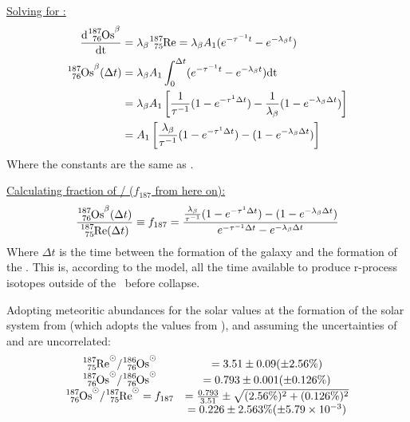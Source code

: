 \underline{Solving for :}
\begin{align*}
  \d{\os{187}^\beta} &= \lambda_\beta \re{187} = \lambda_\beta A_1 (e^{-\tau^{-1}t} - e^{-\lambda_\beta t}) \\
  \os{187}^\beta(\Delta t) &= \lambda_\beta A_1 \int_0^{\Delta t} (e^{-\tau^{-1}t} - e^{-\lambda_\beta t}) \textrm{dt} \\
  &= \lambda_\beta A_1 \left[ \frac{1}{\tau^{-1}} (1-e^{-\tau^{1}\Delta t}) - \frac{1}{\lambda_\beta} (1-e^{-\lambda_\beta \Delta t}) \right] \\
  &= A_1 \left[ \frac{\lambda_\beta}{\tau^{-1}} (1-e^{-\tau^{1}\Delta t}) - (1-e^{-\lambda_\beta \Delta t}) \right] \\
\end{align*}
Where the constants are the same as .

\newcommand\fraction{\frac{\os{187}}{\re{187}}}
\newcommand\fracfsos{f_{187}(t_{sos})}
\newcommand\fracnow{f_{187}(t_{now})}
\underline{Calculating fraction of / ($f_{187}$ from here on):}
\begin{equation}
  \label{eq:luck-fractio}
  \frac{\os{187}^\beta(\Delta t)}{\re{187}(\Delta t)} \equiv f_{187} = \frac{\frac{\lambda_\beta}{\tau^{-1}} (1-e^{-\tau^{1}\Delta t}) - (1-e^{-\lambda_\beta \Delta t})}{e^{-\tau^{-1} \Delta t} - e^{-\lambda_\beta \Delta t}}
\end{equation}
Where $\Delta t$ is the time between the formation of the galaxy and the formation of the \sos. This is, according to the model, all the time available to produce r-process isotopes outside of the \sos\ before collapse.

Adopting meteoritic abundances for the solar values at the formation of the solar system from  (which adopts the values from ), and assuming the uncertainties of  and  are uncorrelated:
\begin{equation}
  \label{eq:shizuma-frac}
  \begin{array}{cc}
    \re{187}^\odot/\os{186}^\odot &= 3.51 \pm 0.09 (\pm 2.56\%) \\
    \os{187}^\odot/\os{186}^\odot &= 0.793 \pm 0.001 (\pm 0.126\%) \\
    \os{187}^\odot/\re{187}^\odot = f_{187} &= \frac{0.793}{3.51} \pm \sqrt{(2.56\%)^2 + (0.126\%)^2} \\
    &= 0.226 \pm 2.563\% (\pm 5.79\times 10^{-3})
  \end{array}
\end{equation}

